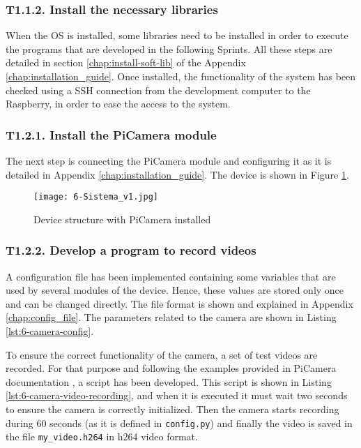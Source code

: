 \subsubsection{T1.1.2. Install the necessary libraries}
When the \ac{OS} is installed, some libraries need to be installed in order to execute the programs that are developed in the following Sprints. All these steps are detailed in section \ref{chap:install-soft-lib} of the Appendix \ref{chap:installation_guide}. Once installed, the functionality of the system has been checked using a SSH connection from the development computer to the Raspberry, in order to ease the access to the system. 

\subsubsection{T1.2.1. Install the PiCamera module}
The next step is connecting the PiCamera module and configuring it as it is detailed in Appendix \ref{chap:installation_guide}. The device is shown in Figure \ref{fig:6-Sistema_v1}. 

\begin{figure}[!h]
	\begin{center}
		\texttt{[image: 6-Sistema\_v1.jpg]}
		\caption{Device structure with PiCamera installed}
		\label{fig:6-Sistema_v1}
	\end{center}
\end{figure}

\subsubsection{T1.2.2. Develop a program to record videos}
A configuration file has been implemented containing some variables that are used by several modules of the device. Hence, these values are stored only once and can be changed directly. The file format is shown and explained in Appendix \ref{chap:config_file}. The parameters related to the camera are shown in Listing \ref{lst:6-camera-config}.



To ensure the correct functionality of the camera, a set of test videos are recorded. For that purpose and following the examples provided in PiCamera documentation \cite{PiCameraDoc}, a script has been developed. This script is shown in Listing \ref{lst:6-camera-video-recording}, and when it is executed it must wait two seconds to ensure the camera is correctly initialized. Then the camera starts recording during 60 seconds (as it is defined in \texttt{config.py}) and finally the video is saved in the file \texttt{my\_video.h264} in h264 video format.

